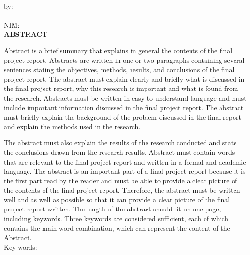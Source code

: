 
\clearpage
{}
{}
\begin{center}
    \textbf{\large{\judulen}}\\[0.5cm]
    by:\\
    \penulis\\
    NIM: \nim\\[2em]
    \textbf{ABSTRACT}\\[0.5cm]
\end{center}

Abstract is a brief summary that explains in general the contents of the final project report. Abstracts are written in one or two paragraphs containing several sentences stating the objectives, methods, results, and conclusions of the final project report. The abstract must explain clearly and briefly what is discussed in the final project report, why this research is important and what is found from the research. Abstracts must be written in easy-to-understand language and must include important information discussed in the final project report. The abstract must briefly explain the background of the problem discussed in the final report and explain the methods used in the research.

The abstract must also explain the results of the research conducted and state the conclusions drawn from the research results. Abstract must contain words that are relevant to the final project report and written in a formal and academic language. The abstract is an important part of a final project report because it is the first part read by the reader and must be able to provide a clear picture of the contents of the final project report. Therefore, the abstract must be written well and as well as possible so that it can provide a clear picture of the final project report written. The length of the abstract should fit on one page, including keywords. Three keywords are considered sufficient, each of which contains the main word combination, which can represent the content of the Abstract.\\[0.6cm]

\noindent Key words: \keywords
